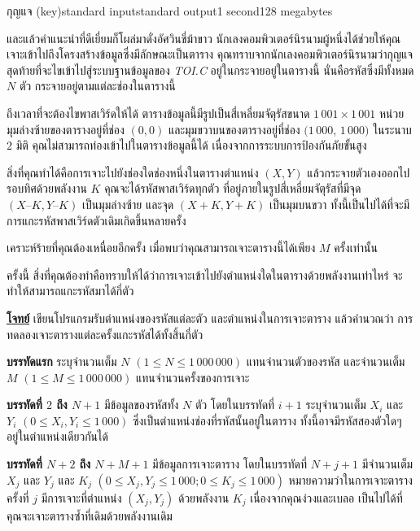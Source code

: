\documentclass[11pt,a4paper]{article}
\begin{document}
\begin{problem}{กุญแจ (key)}{standard input}{standard output}{1 second}{128 megabytes}

  และแล้วคำแนะนำที่ดีเยี่ยมก็โผล่มาดั่งอัศวินขี่ม้าขาว นักเลงคอมพิวเตอร์นิรนามผู้หนึ่งได้ช่วยให้คุณเจาะเข้าไปถึงโครงสร้างข้อมูลซึ่งมีลักษณะเป็นตาราง คุณทราบจากนักเลงคอมพิวเตอร์นิรนามว่ากุญแจสุดท้ายที่จะไขเข้าไปสู่ระบบฐานข้อมูลของ \textit{TOI.C} อยู่ในกระจายอยู่ในตารางนี้ นั่นคือรหัสซึ่งมีทั้งหมด $N$ ตัว กระจายอยู่ตามแต่ละช่องในตารางนี้

            ถึงเวลาที่จะต้องไขพาสเวิร์ดให้ได้ ตารางข้อมูลนี้มีรูปเป็นสี่เหลี่ยมจัตุรัสขนาด $1\,001 \times 1\,001$ หน่วย มุมล่างซ้ายของตารางอยู่ที่ช่อง $(0,0)$ และมุมขวาบนของตารางอยู่ที่ช่อง $(1\,000$, $1\,000)$ ในระนาบ $2$ มิติ คุณไม่สามารถท่องเข้าไปในตารางข้อมูลนี้ได้ เนื่องจากการระบบการป้องกันภัยขั้นสูง

            สิ่งที่คุณทำได้คือการเจาะไปยังช่องใดช่องหนึ่งในตารางตำแหน่ง $(X, Y)$ แล้วกระจายตัวเองออกไปรอบทิศด้วยพลังงาน $K$ คุณจะได้รหัสพาสเวิร์ดทุกตัว ที่อยู่ภายในรูปสี่เหลี่ยมจัตุรัสที่มีจุด $(X – K, Y – K)$ เป็นมุมล่างซ้าย และจุด $(X + K, Y + K)$ เป็นมุมบนขวา ทั้งนี้เป็นไปได้ที่จะมีการแกะรหัสพาสเวิร์ดตัวเดิมเกิดขึ้นหลายครั้ง

เคราะห์ร้ายที่คุณต้องเหนื่อยอีกครั้ง เมื่อพบว่าคุณสามารถเจาะตารางนี้ได้เพียง $M$ ครั้งเท่านั้น

ครั้งนี้ สิ่งที่คุณต้องทำคือทราบให้ได้ว่าการเจาะเข้าไปยังตำแหน่งใดในตารางด้วยพลังงานเท่าไหร่ จะทำให้สามารถแกะรหัสมาได้กี่ตัว

\bigskip
\underline{\textbf{โจทย์}}  เขียนโปรแกรมรับตำแหน่งของรหัสแต่ละตัว และตำแหน่งในการเจาะตาราง แล้วคำนวณว่า การทดลองเจาะตารางแต่ละครั้งแกะรหัสได้ทั้งสิ้นกี่ตัว

\InputFile

\textbf{บรรทัดแรก} ระบุจำนวนเต็ม $N$ $(1 \leq N \leq 1\,000\,000)$ แทนจำนวนตัวของรหัส และจำนวนเต็ม $M$ $(1 \leq M \leq 1\,000\,000)$ แทนจำนวนครั้งของการเจาะ

\textbf{บรรทัดที่ $2$ ถึง $N+1$}  มีข้อมูลของรหัสทั้ง $N$ ตัว โดยในบรรทัดที่ $i + 1$ ระบุจำนวนเต็ม $X_i$ และ $Y_i$ $(0 \leq X_i, Y_i \leq 1\,000)$ ซึ่งเป็นตำแหน่งช่องที่รหัสนั้นอยู่ในตาราง ทั้งนี้อาจมีรหัสสองตัวใดๆ อยู่ในตำแหน่งเดียวกันได้

\textbf{บรรทัดที่ $N+2$ ถึง $N+M+1$} มีข้อมูลการเจาะตาราง โดยในบรรทัดที่ $N + j + 1$ มีจำนวนเต็ม $X_j$ และ $Y_j$ และ $K_j$ $(0 \leq X_j, Y_j \leq 1\,000; 0 \leq K_j \leq 1\,000)$ หมายความว่าในการเจาะตารางครั้งที่ $j$ มีการเจาะที่ตำแหน่ง $(X_j, Y_j)$ ด้วยพลังงาน $K_j$ เนื่องจากคุณง่วงและเบลอ เป็นไปได้ที่คุณจะเจาะตารางซ้ำที่เดิมด้วยพลังงานเดิม


\end{problem}
\end{document}
